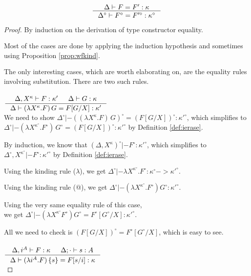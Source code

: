 \begin{theorem}
\label{thm:ierasetyconeq}
\[ \inference{\Delta |- F=F':\kappa}
		{\Delta^\circ |- F^\circ=F'^\circ:\kappa^\circ}
\]
\end{theorem}\begin{proof}
By induction on the derivation of type constructor equality.

Most of the cases are done by applying the induction hypothesis
and sometimes using Proposition \ref{prop:wfkind}.

The only interesting cases, which are worth elaborating on, are the
equality rules involving substitution.  There are two such rules.

\paragraph{}
  $\inference{\Delta,X^\kappa |- F:\kappa' & \Delta |- G:\kappa}
             {\Delta |- (\lambda X^\kappa.F)\,G = F[G/X]:\kappa'}$ \\

We need to show
$ \Delta^\circ |- ((\lambda X^\kappa.F)\,G)^\circ = (F[G/X])^\circ : \kappa'^\circ $,
which simplifies to 
$ \Delta^\circ |- (\lambda X^{\kappa^\circ}.F^\circ)\,G^\circ = (F[G/X])^\circ : \kappa'^\circ $
by Definition \ref{def:ierase}.

By induction, we know that $(\Delta,X^\kappa)^\circ |- F^\circ : \kappa'^\circ$,
which simplifies to $\Delta^\circ,X^{\kappa^\circ} |- F^\circ : \kappa'^\circ$
by Definition \ref{def:ierase}.

Using the kinding rule ($\lambda$), we get
$\Delta^\circ |- \lambda X^{\kappa^\circ}. F^\circ : \kappa^\circ -> \kappa'^\circ$.

Using the kinding rule ($@$), we get
$\Delta^\circ |- (\lambda X^{\kappa^\circ}. F^\circ) G^\circ : \kappa'^\circ$.

Using the very same equality rule of this case,\\ we get 
$\Delta^\circ |- (\lambda X^{\kappa^\circ} F^\circ) G^\circ =
F^\circ[G^\circ/X] : \kappa'^\circ$.

All we need to check is $(F[G/X])^\circ = F^\circ[G^\circ/X]$,
which is easy to see.

\paragraph{}
  $\inference{\Delta,i^A |- F:\kappa & \Delta;\cdot |- s:A}
             {\Delta |- (\lambda i^A.F)\,\{s\} = F[s/i]:\kappa}$ \\


\end{proof}
